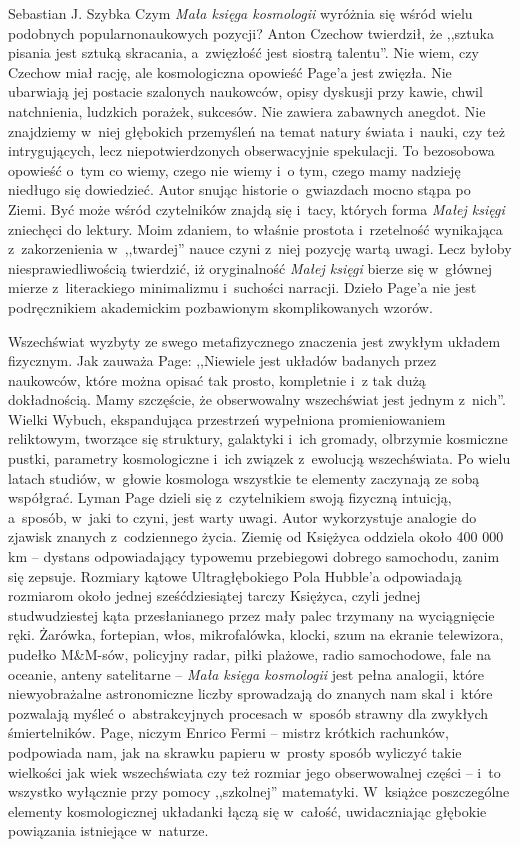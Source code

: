 \begin{newrevplenv}{Sebastian J. Szybka}
Czym \textit{Mała księga kosmologii} wyróżnia się wśród wielu podobnych popularnonaukowych pozycji? Anton Czechow twierdził, że ,,sztuka pisania jest sztuką skracania, a~zwięzłość jest siostrą talentu''. Nie wiem, czy Czechow miał rację, ale kosmologiczna opowieść Page'a jest zwięzła. Nie ubarwiają jej postacie szalonych naukowców, opisy dyskusji przy kawie, chwil natchnienia, ludzkich porażek, sukcesów. Nie zawiera zabawnych anegdot. Nie znajdziemy w~niej głębokich przemyśleń na temat natury świata i~nauki, czy też intrygujących, lecz niepotwierdzonych obserwacyjnie spekulacji. To bezosobowa opowieść o~tym co wiemy, czego nie wiemy i~o tym, czego mamy nadzieję niedługo się dowiedzieć. Autor snując historie o~gwiazdach mocno stąpa po Ziemi. Być może wśród czytelników znajdą się i~tacy, których forma \textit{Małej księgi} zniechęci do lektury. Moim zdaniem, to właśnie prostota i~rzetelność wynikająca z~zakorzenienia w~,,twardej'' nauce czyni z~niej pozycję wartą uwagi. Lecz byłoby niesprawiedliwością twierdzić, iż oryginalność \textit{Małej księgi} bierze się w~głównej mierze z~literackiego minimalizmu i~suchości narracji. Dzieło Page'a nie jest podręcznikiem akademickim pozbawionym skomplikowanych wzorów.

Wszechświat wyzbyty ze swego metafizycznego znaczenia jest zwykłym układem fizycznym. Jak zauważa Page: ,,Niewiele jest układów badanych przez naukowców, które można opisać tak prosto, kompletnie i~z tak dużą dokładnością. Mamy szczęście, że obserwowalny wszechświat jest jednym z~nich''. Wielki Wybuch, ekspandująca przestrzeń wypełniona promieniowaniem reliktowym, tworzące się struktury, galaktyki i~ich gromady, olbrzymie kosmiczne pustki, parametry kosmologiczne i~ich związek z~ewolucją wszechświata. Po wielu latach studiów, w~głowie kosmologa wszystkie te elementy zaczynają ze sobą współgrać. Lyman Page dzieli się z~czytelnikiem swoją fizyczną intuicją, a~sposób, w~jaki to czyni, jest warty uwagi. Autor wykorzystuje analogie do zjawisk znanych z~codziennego życia. Ziemię od Księżyca oddziela około 400 000 km -- dystans odpowiadający typowemu przebiegowi dobrego samochodu, zanim się zepsuje. Rozmiary kątowe Ultragłębokiego Pola Hubble'a odpowiadają rozmiarom około jednej sześćdziesiątej tarczy Księżyca, czyli jednej studwudziestej kąta przesłanianego przez mały palec trzymany na wyciągnięcie ręki. Żarówka, fortepian, włos, mikrofalówka, klocki, szum na ekranie telewizora, pudełko M\&M-sów, policyjny radar, piłki plażowe, radio samochodowe, fale na oceanie, anteny satelitarne -- \textit{Mała księga kosmologii} jest pełna analogii, które niewyobrażalne astronomiczne liczby sprowadzają do znanych nam skal i~które pozwalają myśleć o~abstrakcyjnych procesach w~sposób strawny dla zwykłych śmiertelników. Page, niczym Enrico Fermi -- mistrz krótkich rachunków, podpowiada nam, jak na skrawku papieru w~prosty sposób wyliczyć takie wielkości jak wiek wszechświata czy też rozmiar jego obserwowalnej części -- i~to wszystko wyłącznie przy pomocy ,,szkolnej'' matematyki. W~książce poszczególne elementy kosmologicznej układanki łączą się w~całość, uwidaczniając głębokie powiązania istniejące w~naturze.


\end{newrevplenv}
